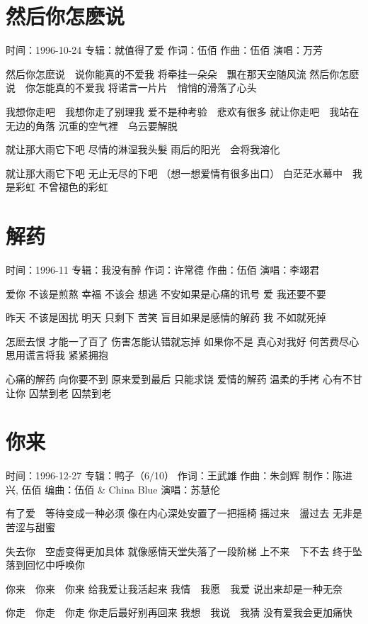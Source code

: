 \documentclass[UTF8,a4paper,oneside,twocolumn,12pt]{ctexbook}
\newcommand{\infopair}[2]{\textbullet #1：#2}
\newcommand{\zc}[1][伍佰]{\infopair{作词}{#1}}
\newcommand{\zq}[1][伍佰]{\infopair{作曲}{#1}}
\newcommand{\bq}[1][伍佰]{\infopair{编曲}{#1}}
\newcommand{\zj}[1]{\infopair{专辑}{#1}}
\newcommand{\zz}[1]{\infopair{制作}{#1}}
\newcommand{\sj}[1]{\infopair{时间}{#1}}
\newenvironment{info}{\begin{flushleft}\kaishu
	}
	{\end{flushleft}\normalsize\yahei\par}
\newenvironment{lyric}{
	}
{}
\begin{document}
\section{然后你怎麽说}
\begin{info}
	\sj{1996-10-24}
	\zj{就值得了爱}
	\zc
	\zq
	\infopair{演唱}{万芳}
\end{info}
\begin{lyric}
	然后你怎麽说　说你能真的不爱我
	将牵挂一朵朵　飘在那天空随风流
	然后你怎麽说　你怎能真的不爱我
	将诺言一片片　悄悄的滑落了心头

	我想你走吧　我想你走了别理我
	爱不是种考验　悲欢有很多
	就让你走吧　我站在无边的角落
	沉重的空气裡　乌云要解脱

	就让那大雨它下吧
	尽情的淋湿我头髮
	雨后的阳光　会将我溶化

	就让那大雨它下吧
	无止无尽的下吧
	（想一想爱情有很多出口）
	白茫茫水幕中　我是彩虹
	不曾褪色的彩虹
\end{lyric}

\section{解药}
\begin{info}
	\sj{1996-11}
	\zj{我没有醉}
	\zc[许常德]
	\zq
	\infopair{演唱}{李翊君}
\end{info}
\begin{lyric}
	爱你 不该是煎熬 幸福 不该会 想逃
	不安如果是心痛的讯号 爱 我还要不要

	昨天 不该是困扰 明天 只剩下 苦笑
	盲目如果是感情的解药 我 不如就死掉

	怎麽去恨 才能一了百了 伤害怎能认错就忘掉
	如果你不是 真心对我好 何苦费尽心思用谎言将我 紧紧拥抱

	心痛的解药 向你要不到 原来爱到最后 只能求饶
	爱情的解药 温柔的手拷 心有不甘让你 囚禁到老 囚禁到老
\end{lyric}

\section{你来}
\begin{info}
	\sj{1996-12-27}
	\zj{鸭子（6/10）}
	\zc[王武雄]
	\zq[朱剑辉]
	\zz{陈进兴, 伍佰}
	\bq[伍佰 \& China Blue]
	\infopair{演唱}{苏慧伦}
\end{info}
\begin{lyric}
	有了爱　等待变成一种必须
	像在内心深处安置了一把摇椅
	摇过来　盪过去
	无非是苦涩与甜蜜

	失去你　空虚变得更加具体
	就像感情天堂失落了一段阶梯
	上不来　下不去
	终于坠落到回忆中呼唤你

	你来　你来　你来
	给我爱让我活起来
	我情　我愿　我爱
	说出来却是一种无奈

	你走　你走　你走
	你走后最好别再回来
	我想　我说　我猜
	没有爱我会更加痛快
\end{lyric}
\end{document}
